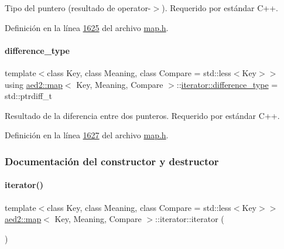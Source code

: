 \begin{Indent}
Tipo del puntero (resultado de operator-\/$>$). Requerido por estándar C++. 



Definición en la línea \hyperlink{map_8h_source_l01625}{1625} del archivo \hyperlink{map_8h_source}{map.\+h}.

\mbox{\label{classaed2_1_1map_1_1iterator_a803083681db1f62aed5138194abc1f06_a803083681db1f62aed5138194abc1f06}} 
\paragraph{\texorpdfstring{difference\+\_\+type}{difference\_type}}
{\footnotesize\ttfamily template$<$class Key, class Meaning, class Compare = std\+::less$<$\+Key$>$$>$ \\
using \hyperlink{classaed2_1_1map}{aed2\+::map}$<$ Key, Meaning, Compare $>$\+::\hyperlink{classaed2_1_1map_1_1iterator_a803083681db1f62aed5138194abc1f06_a803083681db1f62aed5138194abc1f06}{iterator\+::difference\+\_\+type} =  std\+::ptrdiff\+\_\+t}



Resultado de la diferencia entre dos punteros. Requerido por estándar C++. 



Definición en la línea \hyperlink{map_8h_source_l01627}{1627} del archivo \hyperlink{map_8h_source}{map.\+h}.



\subsubsection{Documentación del constructor y destructor}
\mbox{\label{classaed2_1_1map_1_1iterator_acdd790eb54216601a2e0591776004dba_acdd790eb54216601a2e0591776004dba}} 
\paragraph{\texorpdfstring{iterator()}{iterator()}\hspace{0.1cm}{\footnotesize\ttfamily [1/2]}}
{\footnotesize\ttfamily template$<$class Key, class Meaning, class Compare = std\+::less$<$\+Key$>$$>$ \\
\hyperlink{classaed2_1_1map}{aed2\+::map}$<$ Key, Meaning, Compare $>$\+::iterator\+::iterator (\begin{DoxyParamCaption}{ }\end{DoxyParamCaption})\hspace{0.3cm}{\ttfamily [inline]}}




\end{Indent}
